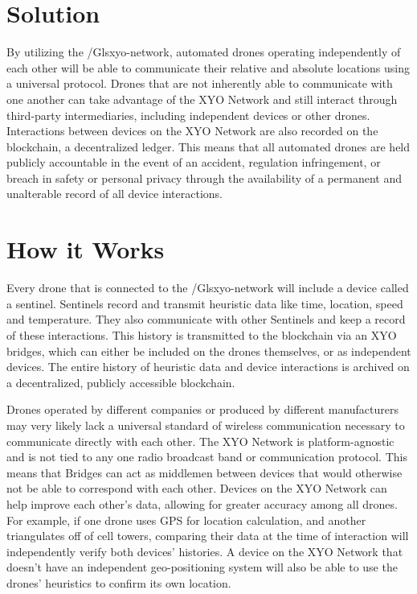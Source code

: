 \documentclass{article}
\begin{document}
\section {Solution}
By utilizing the /Gls{xyo-network}, automated drones operating independently of each other will be able to communicate their relative and absolute locations using a universal protocol. Drones that are not inherently able to communicate with one another can take advantage of the XYO Network and still interact through third-party intermediaries, including independent devices or other drones. Interactions between devices on the XYO Network are also recorded on the blockchain, a decentralized ledger. This means that all automated drones are held publicly accountable in the event of an accident, regulation infringement, or breach in safety or personal privacy through the availability of a permanent and unalterable record of all device interactions.

\section {How it Works}
Every drone that is connected to the /Gls{xyo-network} will include a device called a \Gls{sentinel}. Sentinels record and transmit \gls{heuristic} data like time, location, speed and temperature. They also communicate with other Sentinels and keep a record of these interactions. This history is transmitted to the blockchain via an XYO \Glspl{bridge}, which can either be included on the drones themselves, or as independent devices. The entire history of heuristic data and device interactions is archived on a decentralized, publicly accessible blockchain.

Drones operated by different companies or produced by different manufacturers may very likely lack a universal standard of wireless communication necessary to communicate directly with each other. The XYO Network is platform-agnostic and is not tied to any one radio broadcast band or communication protocol. This means that Bridges can act as middlemen between devices that would otherwise not be able to correspond with each other. Devices on the XYO Network can help improve each other's data, allowing for greater \gls{accuracy} among all drones. For example, if one drone uses GPS for location calculation, and another triangulates off of cell towers, comparing their data at the time of interaction will independently verify both devices' histories. A device on the XYO Network that doesn't have an independent geo-positioning system will also be able to use the drones' heuristics to confirm its own location.
\end{document}
